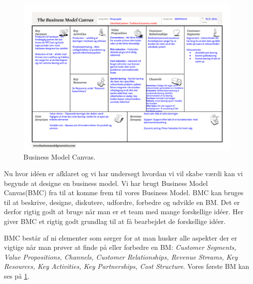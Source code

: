 \begin{figure}
  \includegraphics[angle=90, height=0.95\textheight]{graphics/BM.pdf}
  \caption{Business Model Canvas.}
  \label{bm}
\end{figure}

Nu hvor idéen er afklaret og vi har undersøgt hvordan vi vil skabe værdi kan vi begynde at designe en business model.
Vi har brugt Business Model Canvas(BMC) fra \citet{osterwalder2009business} til at komme frem til vores Business Model.
BMC kan bruges til at beskrive, designe, diskutere, udfordre, forbedre og udvikle en BM.
Det er derfor rigtig godt at bruge når man er et team med mange forskellige idéer.
Her giver BMC et rigtig godt grundlag til at få bearbejdet de forskellige idéer.


BMC består af ni elementer som sørger for at man husker alle aspekter der er vigtige når man prøver at finde på eller forbedre en BM: \textit{Customer Segments, Value Propositions, Channels, Customer Relationships, Revenue Streams, Key Resources, Key Activities, Key Partnerships, Cost Structure}.
Vores første BM kan ses på \cref{bm}.
	
